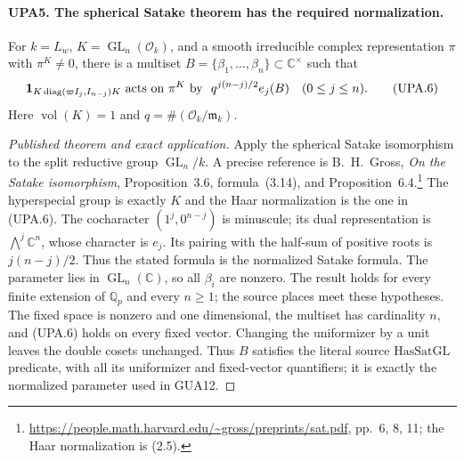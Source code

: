 \paragraph{UPA5. The spherical Satake theorem has the required normalization.}
\label{claim:UPA5}
For $k=L_w$, $K=\operatorname{GL}_n(\mathcal O_k)$,
and a smooth irreducible complex representation $\pi$ with
$\pi^K\ne0$, there is a multiset
$B=\{\beta_1,\ldots,\beta_n\}\subset\mathbb C^\times$
such that
\[
 {\bf1}_{K\operatorname{diag}(\varpi I_j,I_{n-j})K}
       \ \text{acts on }\pi^K\text{ by }\
 q^{j(n-j)/2}e_j(B)\quad(0\leq j\leq n).
 \tag{UPA.6}
\]
Here $\operatorname{vol}(K)=1$ and $q=\#(\mathcal O_k/\mathfrak m_k)$.
\begin{proof}[Published theorem and exact application]
Apply the spherical Satake isomorphism to the split reductive group
$\operatorname{GL}_n/k$.  A precise reference is B.~H.~Gross,
\emph{On the Satake isomorphism}, Proposition~3.6,
formula~(3.14), and Proposition~6.4.\footnote{
\url{https://people.math.harvard.edu/~gross/preprints/sat.pdf},
pp.~6, 8, 11; the Haar normalization is (2.5).}
The hyperspecial group is exactly $K$ and the Haar normalization
is the one in (UPA.6).  The cocharacter $(1^j,0^{n-j})$
is minuscule; its dual representation is $\bigwedge^j\mathbb C^n$,
whose character is $e_j$.  Its pairing with the half-sum of
positive roots is $j(n-j)/2$.  Thus the stated formula is
the normalized Satake formula.  The parameter lies in
$\operatorname{GL}_n(\mathbb C)$, so all $\beta_i$ are nonzero.
The result holds for every finite extension of $\mathbb Q_p$
and every $n\geq1$; the source places meet these hypotheses.
The fixed space is nonzero and one dimensional, the multiset has
cardinality $n$, and (UPA.6) holds on every fixed vector.
Changing the uniformizer by a unit leaves the double cosets unchanged.
Thus $B$ satisfies the literal source $\mathrm{HasSatGL}$ predicate,
with all its uniformizer and fixed-vector quantifiers; it is exactly
the normalized parameter used in GUA12.
\end{proof}

